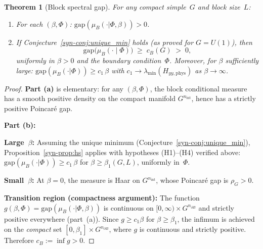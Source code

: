 \documentclass[11pt]{article}
\newtheorem{theorem}{Theorem}[section]
\theoremstyle{definition}
\newcommand{\gap}{\mathrm{gap}}
\begin{document}
\begin{theorem}[Block spectral gap]
\label{syn-thm:block_gap}
For any compact simple~$G$ and block size~$L$:
\begin{enumerate}[label=\textup{(\alph*)},nosep]
\item For each $(\beta, \Phi)$:
  $\gap(\mu_B(\cdot|\Phi, \beta)) > 0$.
\item If Conjecture~\ref{syn-conj:unique_min} holds
  \textup{(}as proved for $G = U(1)$\textup{)}, then
\begin{equation}\label{syn-eq:block_gap}
  \gap\!\bigl(\mu_B(\cdot \mid \Phi)\bigr)
  \;\geq\; c_B(G) \;>\; 0,
\end{equation}
uniformly in $\beta > 0$ and the boundary condition~$\Phi$.
Moreover, for $\beta$ sufficiently large:
$\gap(\mu_B(\cdot|\Phi)) \geq c_1\,\beta$ with
$c_1 \to \lambda_{\min}(H_{yy,\mathrm{phys}})$ as
$\beta \to \infty$.
\end{enumerate}
\end{theorem}

\begin{proof}
\textbf{Part (a)} is elementary: for any $(\beta, \Phi)$,
the block conditional measure has a smooth positive
density on the compact manifold $G^{n_{\mathrm{int}}}$,
hence has a strictly positive Poincar\'e gap.

\smallskip
\noindent\textbf{Part (b):}

\noindent\textbf{Large~$\beta$:}
Assuming the unique minimum
(Conjecture~\ref{syn-conj:unique_min}),
Proposition~\ref{syn-prop:hs} applies with hypotheses
(H1)--(H4) verified above:
$\gap(\mu_B(\cdot|\Phi)) \geq c_1\,\beta$ for
$\beta \geq \beta_1(G, L)$, uniformly in~$\Phi$.

\smallskip
\noindent\textbf{Small~$\beta$:} At $\beta = 0$, the measure
is Haar on $G^{n_{\mathrm{int}}}$, whose Poincar\'e gap is
$\rho_G > 0$.

\smallskip
\noindent\textbf{Transition region (compactness argument):}
The function $g(\beta, \Phi) = \gap(\mu_B(\cdot|\Phi,\beta))$
is continuous on $[0,\infty) \times G^{n_{\partial B}}$
and strictly positive everywhere (part~(a)).
Since $g \geq c_1 \beta$ for $\beta \geq \beta_1$, the
infimum is achieved on the \emph{compact} set
$[0, \beta_1] \times G^{n_{\partial B}}$, where $g$ is
continuous and strictly positive.
Therefore $c_B := \inf g > 0$.
\end{proof}
\end{document}
